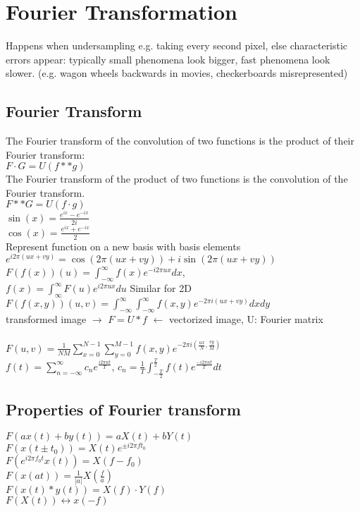 

\section{Fourier Transformation}
 Happens when undersampling e.g. taking every second pixel, else characteristic errors appear: typically small phenomena look bigger, fast phenomena look slower. (e.g. wagon wheels backwards in movies, checkerboards misrepresented)
\subsection*{Fourier Transform}
 The Fourier transform of the convolution of two functions is the product of their Fourier transform:\\
$F \cdot G = U(f ** g)$\\
 The Fourier transform of the product of two functions is the convolution of the Fourier transform.\\
$F ** G = U(f \cdot g)$\\
$\sin(x) = \frac{e^{ix} - e^{-ix}}{2i}$\\
$\cos(x) = \frac{e^{ix} + e^{-ix}}{2}$\\
Represent function on a new basis with basis elements $e^{i 2 \pi (ux + vy)} = \cos(2 \pi (ux + vy)) + i \sin(2 \pi (ux + vy))$\\
$F(f(x))(u) = \int_{-\infty}^{\infty} f(x) e^{-i 2 \pi ux} dx$, \\
 $f(x) = \int_{\infty}^{\infty} F(u)e^{i2\pi ux} du$ Similar for 2D \\
 $F(f(x,y))(u, v) = \int_{-\infty}^{\infty} \int_{-\infty}^{\infty} f(x, y) e^{-2\pi i (ux + vy)}dx dy$\\
 transformed image $\rightarrow$ $F = U * f$ $\leftarrow$ vectorized image, U: Fourier matrix\\
 \\$F(u, v) = \frac{1}{NM}\sum_{x=0}^{N-1} \sum_{y=0}^{M-1} f(x, y) e^{-2\pi i (\frac{ux}{N}, \frac{vy}{M})}$\\ %
 $f(t) = \sum_{n = -\infty}^{\infty} c_n e^{\frac{i 2 \pi n t}{T}}$, $c_n = \frac{1}{T} \int_{-\frac{T}{2}}^{\frac{T}{2}} f(t) e^{\frac{-i 2 \pi n t}{T}} dt$
\subsection*{Properties of Fourier transform}
 $F(ax(t) + by(t)) = aX(t) + bY(t)$\\
 $F(x(t \pm t_0)) = X(t) e^{\pm i 2 \pi f t_0}$\\
 $F(e^{i 2 \pi f_0 t} x(t)) = X(f - f_0)$\\
 $F(x(at)) = \frac{1}{|a|}X\left(\frac{f}{a}\right)$\\
 $F(x(t) * y(t)) = X(f) \cdot Y(f)$\\
 $F(X(t)) \longleftrightarrow x(-f)$

